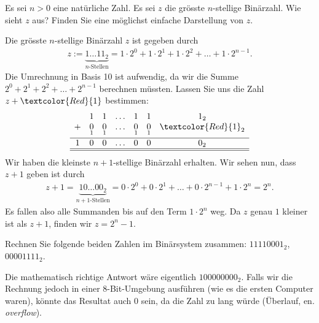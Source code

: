 \begin{mychallenge}
	Es sei $n>0$ eine natürliche Zahl. Es sei $z$ die grösste $n$-stellige Binärzahl. Wie sieht $z$ aus? Finden Sie eine möglichst einfache Darstellung von $z$.
	\begin{myanswer}
		Die grösste $n$-stellige Binärzahl $z$ ist gegeben durch
		\begin{align*}
			z := \underbrace{1\ldots 11_2}_{n\text{-Stellen}} = 1\cdot 2^0 + 1\cdot 2^1 + 1\cdot 2^2 + \ldots + 1\cdot 2^{n-1}.
		\end{align*}
		Die Umrechnung in Basis 10 ist aufwendig, da wir die Summe $2^0 + 2^1 + 2^2 + \ldots + 2^{n-1}$ berechnen müssten. Lassen Sie uns die Zahl $z+\textcolor{Red}{1}$ bestimmen:
		\[
			\begin{array}{ccccccc}
				  & 1               & 1               & \ldots & 1               & 1               & 1_2                               \\
				+ & \underset{1}{0} & \underset{1}{0} & \ldots & \underset{1}{0} & \underset{1}{0} & \underset{}{\textcolor{Red}{1}_2} \\
				\hline
				1 & 0               & 0               & \ldots & 0               & 0               & 0_2                               \\\hline\hline
			\end{array}
		\]
		Wir haben die kleinste $n+1$-stellige Binärzahl erhalten. Wir sehen nun, dass $z+1$ geben ist durch
		\begin{align*}
			z+1 = \underbrace{10\ldots 00_2}_{n+1\text{-Stellen}} = 0\cdot 2^0 + 0\cdot 2^1 + \ldots + 0\cdot 2^{n-1} + 1\cdot 2^n = 2^n.
		\end{align*}
		Es fallen also alle Summanden bis auf den Term $ 1\cdot 2^n$ weg. Da $z$ genau $1$ kleiner ist als $z+1$, finden wir $z = 2^n - 1$.
	\end{myanswer}
\end{mychallenge}

\begin{myexercise}
	Rechnen Sie folgende beiden Zahlen im Binärsystem zusammen: $11110001_2$, $00001111_2$.
	\begin{myanswer}
		Die mathematisch richtige Antwort wäre eigentlich $100000000_2$. Falls wir die Rechnung jedoch in einer 8-Bit-Umgebung ausführen (wie es die ersten Computer waren), könnte das Resultat auch 0 sein, da die Zahl zu lang würde (Überlauf, en. \textit{overflow}).
	\end{myanswer}
\end{myexercise}

